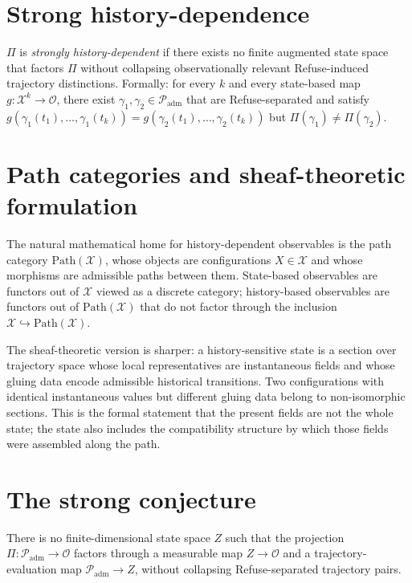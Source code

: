\documentclass[12pt, oneside]{memoir}
\newcommand{\X}{\mathcal{X}}
\newcommand{\OO}{\mathcal{O}}
\newcommand{\Padm}{\mathcal{P}_{\mathrm{adm}}}
\begin{document}
\section{Strong history-dependence}

\begin{definition}
$\Pi$ is \emph{strongly history-dependent} if there exists no finite augmented state
space that factors $\Pi$ without collapsing observationally relevant Refuse-induced
trajectory distinctions.  Formally: for every $k$ and every state-based map
$g: \X^k \to \OO$, there exist $\gamma_1, \gamma_2 \in \Padm$ that are
Refuse-separated and satisfy
$g(\gamma_1(t_1), \dots, \gamma_1(t_k)) = g(\gamma_2(t_1), \dots, \gamma_2(t_k))$
but $\Pi(\gamma_1) \ne \Pi(\gamma_2)$.
\end{definition}

\section{Path categories and sheaf-theoretic formulation}

The natural mathematical home for history-dependent observables is the path category
$\mathrm{Path}(\X)$, whose objects are configurations $X \in \X$ and whose morphisms are
admissible paths between them.  State-based observables are functors out of $\X$ viewed
as a discrete category; history-based observables are functors out of $\mathrm{Path}(\X)$
that do not factor through the inclusion $\X \hookrightarrow \mathrm{Path}(\X)$.

The sheaf-theoretic version is sharper: a history-sensitive state is a section over
trajectory space whose local representatives are instantaneous fields and whose gluing
data encode admissible historical transitions.  Two configurations with identical
instantaneous values but different gluing data belong to non-isomorphic sections.  This
is the formal statement that the present fields are not the whole state; the state also
includes the compatibility structure by which those fields were assembled along the path.

\section{The strong conjecture}

\begin{conjecture}
\label{conj:strong}
There is no finite-dimensional state space $Z$ such that the projection $\Pi: \Padm \to
\OO$ factors through a measurable map $Z \to \OO$ and a trajectory-evaluation map
$\Padm \to Z$, without collapsing Refuse-separated trajectory pairs.
\end{conjecture}
\end{document}
